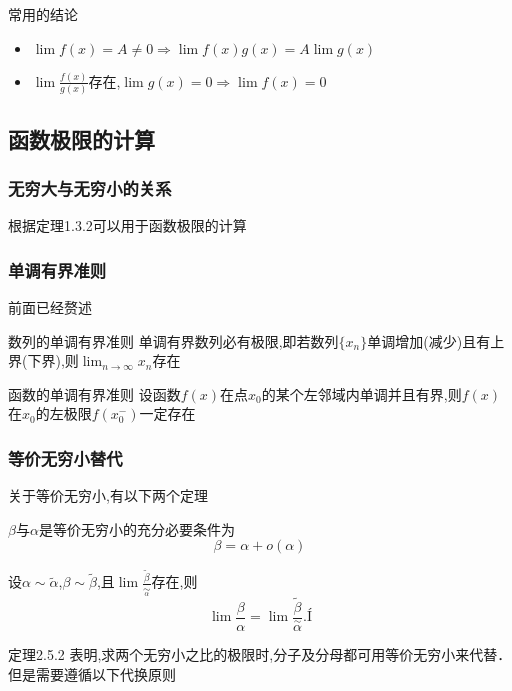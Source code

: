 \documentclass[12pt, a4paper, oneside, UTF8]{ctexbook}  %
\begin{document}
\begin{sloppypar}
    \begin{lemma}{常用的结论}{}
        \begin{itemize}
            \item $\lim f(x)=A \neq 0 \Rightarrow \lim f(x)g(x)=A \lim g(x)$
            \item $\lim \frac{f(x)}{g(x)}$存在,$\lim g(x)=0 \Rightarrow \lim f(x)=0$
        \end{itemize}
    \end{lemma}
    \subsection{函数极限的计算}
    \subsubsection{无穷大与无穷小的关系}
    根据定理1.3.2可以用于函数极限的计算
    \subsubsection{单调有界准则}
    前面已经赘述
    \begin{them}{数列的单调有界准则}{}
        单调有界数列必有极限,即若数列$\{x_n\}$单调增加(减少)且有上界(下界),则$\lim_{n \to \infty} x_n$存在
    \end{them}

    \begin{them}{函数的单调有界准则}{}
        设函数$f(x)$在点$x_0$的某个左邻域内单调并且有界,则$f(x)$在$x_0$的左极限$f(x_0^-)$一定存在
    \end{them}
    \subsubsection{等价无穷小替代}
    关于等价无穷小,有以下两个定理
    \begin{them}{}{}
        $\beta$与$\alpha$是等价无穷小的充分必要条件为
        $$
            \beta=\alpha + o(\alpha)
        $$
    \end{them}

    \begin{them}{}{}
        设$\alpha\sim\widetilde{\alpha}$,$\beta\sim\widetilde{\beta}$,且$\lim\frac{\widetilde{\beta}}{\underset{\alpha}{\operatorname*{\sim}}}$存在,则
        $$
            \lim\frac{\beta}{\alpha}=\lim\frac{\widetilde{\beta}}{\overset{\sim}{\alpha}}.Í
        $$
    \end{them}
    定理2.5.2 表明,求两个无穷小之比的极限时,分子及分母都可用等价无穷小来代替．但是需要遵循以下代换原则


\end{sloppypar}
\end{document}

